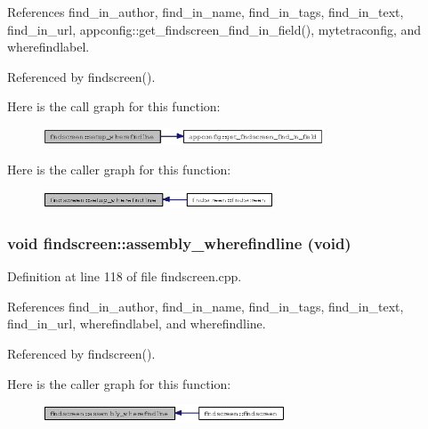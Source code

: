References find\_\-in\_\-author, find\_\-in\_\-name, find\_\-in\_\-tags, find\_\-in\_\-text, find\_\-in\_\-url, appconfig::get\_\-findscreen\_\-find\_\-in\_\-field(), mytetraconfig, and wherefindlabel.

Referenced by findscreen().

Here is the call graph for this function:\begin{figure}[H]
\begin{center}
\leavevmode
\includegraphics[width=237pt]{classfindscreen_2adcd1d1239878bd53219355a809308c_cgraph}
\end{center}
\end{figure}


Here is the caller graph for this function:\begin{figure}[H]
\begin{center}
\leavevmode
\includegraphics[width=195pt]{classfindscreen_2adcd1d1239878bd53219355a809308c_icgraph}
\end{center}
\end{figure}
\subsubsection{\setlength{\rightskip}{0pt plus 5cm}void findscreen::assembly\_\-wherefindline (void)\hspace{0.3cm}{\tt  [private]}}\label{classfindscreen_69dc9172d0b787b30bf9793412c65303}




Definition at line 118 of file findscreen.cpp.

References find\_\-in\_\-author, find\_\-in\_\-name, find\_\-in\_\-tags, find\_\-in\_\-text, find\_\-in\_\-url, wherefindlabel, and wherefindline.

Referenced by findscreen().

Here is the caller graph for this function:\begin{figure}[H]
\begin{center}
\leavevmode
\includegraphics[width=205pt]{classfindscreen_69dc9172d0b787b30bf9793412c65303_icgraph}
\end{center}
\end{figure}
